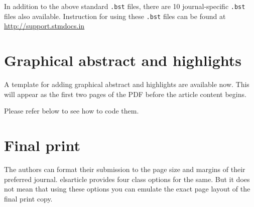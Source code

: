 \documentclass[a4paper,12pt]{article}
\def\file#1{\textsf{#1}\xspace}
\begin{document}
In addition to the above standard \verb+.bst+ files, there are 10
journal-specific \verb+.bst+ files also available.
Instruction for using these \verb+.bst+ files can be found at
\href{http://support.stmdocs.in/wiki/index.php?title=Model-wise_bibliographic_style_files}
{http://support.stmdocs.in}

\section[Graphical ...]{Graphical abstract and highlights}
A template for adding graphical abstract and highlights are available
now. This will appear as the first two pages of the PDF before the
article content begins.

\pagebreak
Please refer below to see how to code them.


\vspace*{-1pc}
\section{Final print}\label{sec:final}

The authors can format their submission to the page size and margins
of their preferred journal.  \file{elsarticle} provides four
class options for the same. But it does not mean that using these
options you can emulate the exact page layout of the final print copy.
\end{document}
